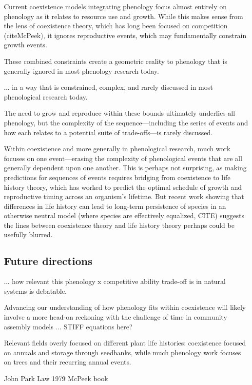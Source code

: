 Current coexistence models integrating phenology focus almost entirely on phenology as it relates to resource use and growth. While this makes sense from the lens of coexistence theory, which has long been focused on competition (citeMcPeek), it ignores reproductive events, which may fundamentally constrain growth events. 

These combined constraints create a geometric reality to phenology that is generally ignored in most phenology research today. 

... in a way that is constrained, complex, and rarely discussed in most phenological research today.  

The need to grow and reproduce within these bounds ultimately underlies all phenology, but the complexity of the sequence---including the series of events and how each relates to a potential suite of trade-offs---is rarely discussed. 

Within coexistence and more generally in phenological research, much work focuses on one event---erasing the complexity of phenological events that are all generally dependent upon one another. This is perhaps not surprising, as making predictions for sequences of events requires bridging from coexistence to life history theory, which has worked to predict the optimal schedule of growth and reproductive timing across an organism's lifetime. But recent work showing that differences in life history can lead to long-term persistence of species in an otherwise neutral model (where species are effectively equalized, CITE) suggests the lines between coexistence theory and life history theory perhaps could be usefully blurred. 


\subsection*{Future directions}

... how relevant this phenology x competitive ability  trade-off is in natural systems is debatable. 
 
 Advancing our understanding of how phenology fits within coexistence will likely involve a more head-on reckoning with the challenge of time in community assembly models ... STIFF equations here? 


Relevant fields overly focused on different plant life histories: coexistence focused on annuals and storage through seedbanks, while much phenology work focuses on trees and their recurring annual events. 

John Park
Law 1979
McPeek book